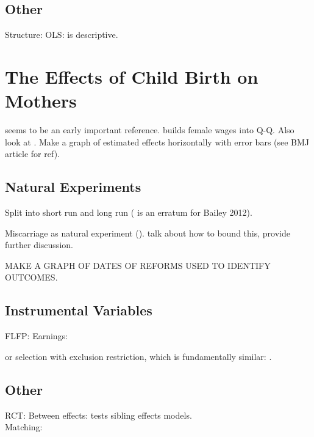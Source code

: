 \subsection{Other}
Structure: \citet{RosenzweigWolpin1995,RosenzweigSchultz1985,
RosenzweigWolpin1980b}
OLS: \citet{Hanushek1992} is descriptive. \citet{Desai1995}


\section{The Effects of Child Birth on Mothers}
\citet{FleisherRhodes1979} seems to be an early important reference. 
\citet{Willis1973} builds female wages into Q-Q.  Also look at \citet{Reuben1973}.
Make a graph of estimated effects horizontally with error bars (see BMJ 
article for ref).

\subsection{Natural Experiments}
Split into short run and long run
\citet{Bailey2011,Baileyetal2012,Bailey2006,Bailey2013,Bailey2012,Christensen2012,
GoldinKatz2002a,Guldi2008,KearnerLevine2009,Levineetal1999,AngristEvans1996,
Jacobsenetal1999,AngristEvans1998,Cristia2008}
(\citet{Bailey2009} is an erratum for Bailey 2012).

Miscarriage as natural experiment (\citet{Hotzetal2005,Fletcher2012}).  
\citet{Hotzetal1997} talk about how to bound this, \citet{FletcherWolfe2009} 
provide further discussion.

MAKE A GRAPH OF DATES OF REFORMS USED TO IDENTIFY OUTCOMES.

\subsection{Instrumental Variables}
FLFP: \citet{AgueroMarks2008,AgueroMarks2011,ChunOh2002,Caceres2008}
Earnings:

\citet{Ananatetal2009,Miller2011,
BronarsGrogger1994,KimAassve2006,RosenzweigSchultz1987,
Caceres2006,Hotzetal1997}
or selection with exclusion restriction, which is fundamentally similar: 
\citet{Ribar1994}.

\subsection{Other}
RCT: \citet{DiCensoetal2002}
Between effects: \citet{Holmlund2005,GeronimusKorenman1992} \citet{Ribar1999} 
tests sibling effects models.\\
Matching: \citet{ChevalierViitanen2003,LevinePainter2003}

\newpage

